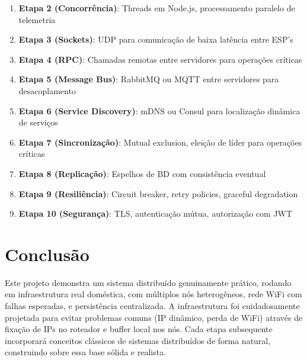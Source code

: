 \documentclass[12pt,a4paper,oneside]{report}
\begin{document}
\begin{enumerate}[leftmargin=1.2cm]
    \item \textbf{Etapa 2 (Concorrência)}: Threads em Node.js, processamento paralelo de telemetria
    \item \textbf{Etapa 3 (Sockets)}: UDP para comunicação de baixa latência entre ESP's
    \item \textbf{Etapa 4 (RPC)}: Chamadas remotas entre servidores para operações críticas
    \item \textbf{Etapa 5 (Message Bus)}: RabbitMQ ou MQTT entre servidores para desacoplamento
    \item \textbf{Etapa 6 (Service Discovery)}: mDNS ou Consul para localização dinâmica de serviços
    \item \textbf{Etapa 7 (Sincronização)}: Mutual exclusion, eleição de líder para operações críticas
    \item \textbf{Etapa 8 (Replicação)}: Espelhos de BD com consistência eventual
    \item \textbf{Etapa 9 (Resiliência)}: Circuit breaker, retry policies, graceful degradation
    \item \textbf{Etapa 10 (Segurança)}: TLS, autenticação mútua, autorização com JWT
\end{enumerate}

\chapter{Conclusão}

Este projeto demonstra um sistema distribuído genuinamente prático, rodando em infraestrutura real doméstica, com múltiplos nós heterogêneos, rede WiFi com falhas esperadas, e persistência centralizada. A infraestrutura foi cuidadosamente projetada para evitar problemas comuns (IP dinâmico, perda de WiFi) através de fixação de IPs no roteador e buffer local nos nós. Cada etapa subsequente incorporará conceitos clássicos de sistemas distribuídos de forma natural, construindo sobre essa base sólida e realista.
\end{document}
